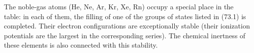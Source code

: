 The noble-gas atoms (He, Ne, Ar, Kr, Xe, Rn) occupy a special place in the table: in each of them, the filling of one of the groups of states listed in (73.1) is completed. Their electron configurations are exceptionally stable (their ionization potentials are the largest in the corresponding series). The chemical inertness of these elements is also connected with this stability.
